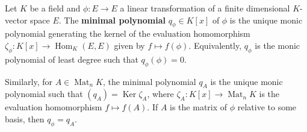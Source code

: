 Let $K$ be a field and $\phi : E \to E$ a linear transformation of a finite dimensional $K$-vector space $E$. The \textbf{minimal polynomial} $q_\phi \in K[x]$ of $\phi$ is the unique monic polynomial generating the kernel of the evaluation homomorphism $\zeta_\phi : K[x] \to \operatorname{Hom}_K(E,E)$ given by $f \mapsto f(\phi)$. Equivalently, $q_\phi$ is the monic polynomial of least degree such that $q_\phi(\phi) = 0$.

Similarly, for $A \in \operatorname{Mat}_n K$, the minimal polynomial $q_A$ is the unique monic polynomial such that $(q_A) = \operatorname{Ker} \zeta_A$, where $\zeta_A : K[x] \to \operatorname{Mat}_n K$ is the evaluation homomorphism $f \mapsto f(A)$. If $A$ is the matrix of $\phi$ relative to some basis, then $q_\phi = q_A$.
